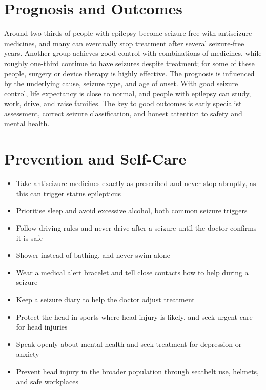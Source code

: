 \section*{Prognosis and Outcomes}
Around two-thirds of people with epilepsy become seizure-free with antiseizure medicines, and many can eventually stop treatment after several seizure-free years. Another group achieves good control with combinations of medicines, while roughly one-third continue to have seizures despite treatment; for some of these people, surgery or device therapy is highly effective. The prognosis is influenced by the underlying cause, seizure type, and age of onset. With good seizure control, life expectancy is close to normal, and people with epilepsy can study, work, drive, and raise families. The key to good outcomes is early specialist assessment, correct seizure classification, and honest attention to safety and mental health.

\section*{Prevention and Self-Care}
\begin{itemize}
    \item Take antiseizure medicines exactly as prescribed and never stop abruptly, as this can trigger status epilepticus
    \item Prioritise sleep and avoid excessive alcohol, both common seizure triggers
    \item Follow driving rules and never drive after a seizure until the doctor confirms it is safe
    \item Shower instead of bathing, and never swim alone
    \item Wear a medical alert bracelet and tell close contacts how to help during a seizure
    \item Keep a seizure diary to help the doctor adjust treatment
    \item Protect the head in sports where head injury is likely, and seek urgent care for head injuries
    \item Speak openly about mental health and seek treatment for depression or anxiety
    \item Prevent head injury in the broader population through seatbelt use, helmets, and safe workplaces
\end{itemize}

